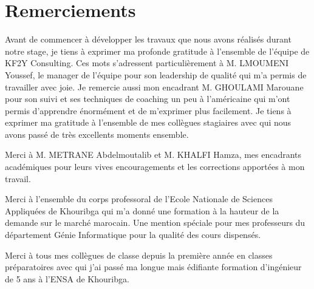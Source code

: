 \chapter*{Remerciements}
Avant de commencer à développer les travaux que nous avons réalisés durant notre stage, je tiens à exprimer ma profonde gratitude à l’ensemble de l’équipe de KF2Y Consulting. Ces mots s’adressent particulièrement à M. LMOUMENI Youssef, le manager de l’équipe pour son leadership de qualité qui m’a permis de travailler avec joie. Je remercie aussi mon encadrant M. GHOULAMI Marouane pour son suivi et ses techniques de coaching un peu  à l’américaine qui m’ont permis d’apprendre énormément et de m’exprimer plus facilement. Je tiens à exprimer ma gratitude à l’ensemble de mes collègues stagiaires avec qui nous avons passé de très excellents moments ensemble. 


Merci à M. METRANE Abdelmoutalib et M. KHALFI Hamza, mes encadrants académiques pour leurs vives encouragements et les corrections apportées à mon travail.


Merci à l’ensemble du corps professoral de l’Ecole Nationale de Sciences Appliquées de Khouribga qui m’a donné une formation à la hauteur de la demande sur le marché marocain. Une mention spéciale pour mes professeurs du département Génie Informatique pour la qualité des cours dispensés.


Merci à tous mes collègues de classe depuis la première année en classes préparatoires avec qui j’ai passé ma longue mais édifiante formation d’ingénieur de 5 ans à l’ENSA de Khouribga. 
